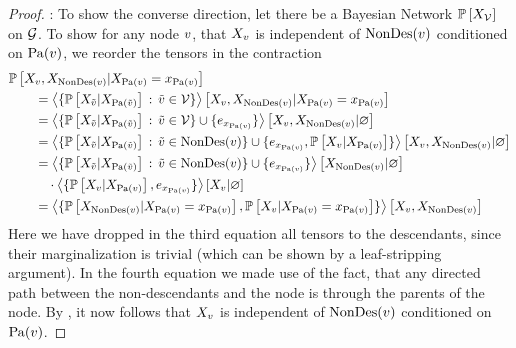 \begin{proof}
    \proofleftsymbol:
    To show the converse direction, let there be a Bayesian Network $\mathbb{P}\left[X_{\mathcal{V}}\right]$ on $\mathcal{G}$.
    To show for any node $v$, that $X_{v}$ is independent of $\mathrm{NonDes}(v)$ conditioned on $\mathrm{Pa}(v)$, we reorder the tensors in the contraction
    \begin{align*}
        & \condprobof{\catvariableof{\node},\catvariableof{\nondescendantsof{\node}}}{\indexedcatvariableof{\parentsof{\node}}} \\
        & \quad\quad = \normationofwrt{
            \{\condprobof{\catvariableof{\secnode}}{\catvariableof{\parentsof{\secnode}}} \, : \, \secnode\in\nodes\}
        }
        {\catvariableof{\node},\catvariableof{\nondescendantsof{\node}}}
        {\indexedcatvariableof{\parentsof{\node}}} \\
        & \quad\quad  = \normationof{
            \{\condprobof{\catvariableof{\secnode}}{\catvariableof{\parentsof{\secnode}}} \, : \, \secnode\in\nodes\} \cup \{\onehotmapof{\catindexof{\parentsof{\node}}}\}
        }
        {\catvariableof{\node},\catvariableof{\nondescendantsof{\node}}}\\
        &  \quad\quad = \normationof{
            \{\condprobof{\catvariableof{\secnode}}{\catvariableof{\parentsof{\secnode}}} \, : \, \secnode\in\nondescendantsof{\node}\} \cup \{\onehotmapof{\catindexof{\parentsof{\node}}}, \condprobof{\catvariableof{\node}}{\catvariableof{\parentsof{\node}}} \}
        }
        {\catvariableof{\node},\catvariableof{\nondescendantsof{\node}}} \\
        &  \quad\quad =  %
        \normationof{
            \{\condprobof{\catvariableof{\secnode}}{\catvariableof{\parentsof{\secnode}}} \, : \, \secnode\in\nondescendantsof{\node}\} \cup \{\onehotmapof{\catindexof{\parentsof{\node}}}\}
        }
        {\catvariableof{\nondescendantsof{\node}}} \\
        & \quad\quad  \quad  \cdot \normationof{
            \{\condprobof{\catvariableof{\node}}{\catvariableof{\parentsof{\node}}},\onehotmapof{\catindexof{\parentsof{\node}}}\}
        }
        {\catvariableof{\node}} \\
        & \quad\quad  = \contractionof{\{
        \condprobof{\catvariableof{\nondescendantsof{\node}}}{\indexedcatvariableof{\parentsof{\node}}},
            \condprobof{\catvariableof{\node}}{\indexedcatvariableof{\parentsof{\node}}}
            \}}{\catvariableof{\node},\catvariableof{\nondescendantsof{\node}}}
    \end{align*}
    Here we have dropped in the third equation all tensors to the descendants, since their marginalization is trivial (which can be shown by a leaf-stripping argument).
    In the fourth equation we made use of the fact, that any directed path between the non-descendants and the node is through the parents of the node.
    By , it now follows that $X_{v}$ is independent of $\mathrm{NonDes}(v)$ conditioned on $\mathrm{Pa}(v)$.
\end{proof}

